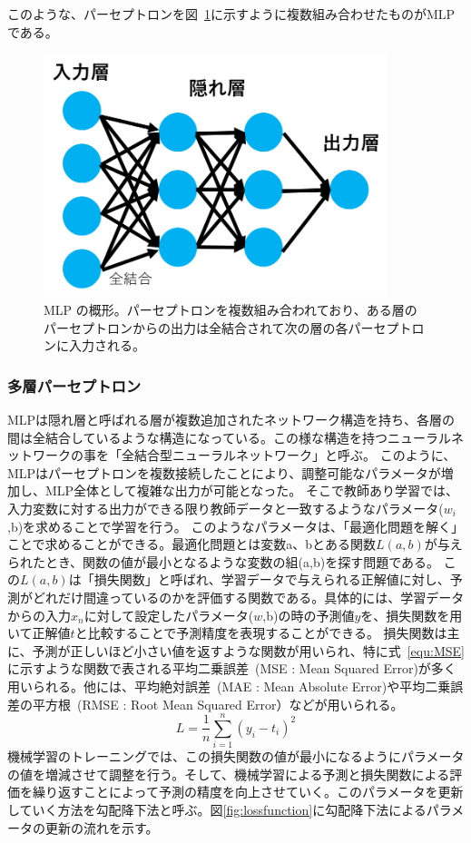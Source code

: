 このような、パーセプトロンを図~\ref{fig:MLP}に示すように複数組み合わせたものがMLPである。
\begin{figure}[tb]
  \centering
  \includegraphics[clip, width=10cm]{fig/4/MLP_re.png}
  \caption{MLP の概形。パーセプトロンを複数組み合われており、ある層のパーセプトロンからの出力は全結合されて次の層の各パーセプトロンに入力される。}
  \label{fig:MLP}
\end{figure}

\subsubsection{多層パーセプトロン}
MLPは隠れ層と呼ばれる層が複数追加されたネットワーク構造を持ち、各層の間は全結合しているような構造になっている。この様な構造を持つニューラルネットワークの事を「全結合型ニューラルネットワーク」と呼ぶ。
このように、MLPはパーセプトロンを複数接続したことにより、調整可能なパラメータが増加し、MLP全体として複雑な出力が可能となった。
そこで教師あり学習では、入力変数に対する出力ができる限り教師データと一致するようなパラメータ($w_i$,b)を求めることで学習を行う。
このようなパラメータは、「最適化問題を解く」ことで求めることができる。最適化問題とは変数a、bとある関数$L(a,b)$が与えられたとき、関数の値が最小となるような変数の組(a,b)を探す問題である。
この$L(a,b)$は「損失関数」と呼ばれ、学習データで与えられる正解値に対し、予測がどれだけ間違っているのかを評価する関数である。具体的には、学習データからの入力$x_n$に対して設定したパラメータ($w$,b)の時の予測値$y$を、損失関数を用いて正解値$t$と比較することで予測精度を表現することができる。
損失関数は主に、予測が正しいほど小さい値を返すような関数が用いられ、特に式~\eqref{equ:MSE}に示すような関数で表される平均二乗誤差~(MSE : Mean Squared Error)が多く用いられる。他には、平均絶対誤差~(MAE : Mean Absolute Error)や平均二乗誤差の平方根~(RMSE : Root Mean Squared Error）などが用いられる。
\begin{equation}
    L = \frac{1}{n}\sum^{n}_{i=1}(y_i-t_i)^2
    \label{equ:MSE}
\end{equation}
機械学習のトレーニングでは、この損失関数の値が最小になるようにパラメータの値を増減させて調整を行う。そして、機械学習による予測と損失関数による評価を繰り返すことによって予測の精度を向上させていく。このパラメータを更新していく方法を勾配降下法と呼ぶ。図\ref{fig:lossfunction}に勾配降下法によるパラメータの更新の流れを示す。

